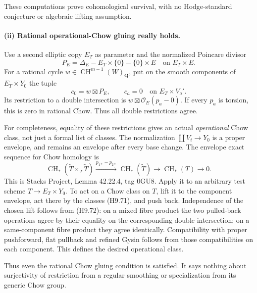 These computations prove cohomological survival, with no
Hodge-standard conjecture or algebraic lifting assumption.

\paragraph{(ii) Rational operational-Chow gluing really holds.}
Use a second elliptic copy $E_T$ as parameter and the normalized
Poincare divisor
\[
 P_E=\Delta_E-E_T\times\{0\}-\{0\}\times E
             \quad\text{on }E_T\times E.
\]
For a rational cycle $w\in\operatorname{CH}^{m-1}(W)_{\mathbf Q}$,
put on the smooth components of $E_T\times Y_0$ the tuple
\[
             c_0=w\boxtimes P_E,
       \qquad c_a=0\quad\text{on }E_T\times V_a'.           \tag{H9.71}
\]
Its restriction to a double intersection is
$w\boxtimes\mathcal O_E(p_a-0)$. If every $p_a$ is torsion, this
is zero in rational Chow. Thus all double restrictions agree.

For completeness, equality of these restrictions gives an actual
\emph{operational} Chow class, not just a formal list of classes.
The normalization $\coprod V_i\to Y_0$ is a proper envelope, and
remains an envelope after every base change. The envelope exact
sequence for Chow homology is
\[
 \operatorname{CH}_*(\widetilde T\times_T\widetilde T)
 \xrightarrow{p_{1*}-p_{2*}}\operatorname{CH}_*(\widetilde T)
 \longrightarrow\operatorname{CH}_*(T)\longrightarrow0.
                                                               \tag{H9.72}
\]
This is Stacks Project, Lemma 42.22.4, tag 0GU8. Apply it to an
arbitrary test scheme $T\to E_T\times Y_0$. To act on a Chow
class on $T$, lift it to the component envelope, act there by the
classes (H9.71), and push back. Independence of the chosen lift
follows from (H9.72): on a mixed fibre product the two pulled-back
operations agree by their equality on the corresponding double
intersection; on a same-component fibre product they agree
identically. Compatibility with proper pushforward, flat pullback
and refined Gysin follows from those compatibilities on each
component. This defines the desired operational class.

Thus even the rational Chow gluing condition is satisfied. It says
nothing about surjectivity of restriction from a regular smoothing
or specialization from its generic Chow group.

